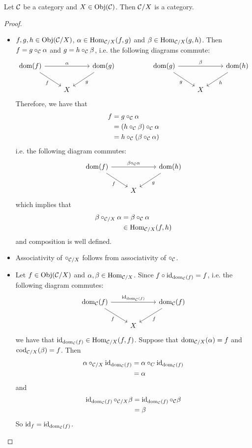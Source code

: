 \documentclass{book}
\begin{document}
	\begin{ex}  
		Let $\mathcal{C}$ be a category and $X \in \operatorname{Obj}(\mathcal{C})$. Then $\mathcal{C} / X$ is a category.
	\end{ex}

	\begin{proof}\
		\begin{itemize}
			\item $f,g, h \in \operatorname{Obj}(\mathcal{C} / X)$, $\alpha \in \operatorname{Hom}_{\mathcal{C} / X}(f, g)$ and $\beta \in \operatorname{Hom}_{\mathcal{C} / X}(g, h)$. Then $f = g \circ_{\mathcal{C}} \alpha$ and $g = h \circ_{\mathcal{C}} \beta$, i.e. the following diagrams commute:
			\[ \begin{tikzcd}
				\dom(f) \arrow[rr, "\al"] \arrow[dr, "f"'] 	
				&& \dom(g)  \arrow[dl, "g"]  
				&& \dom(g) \arrow[rr, "\be"] \arrow[dr, "g"'] 	
				&& \dom(h)  \arrow[dl, "h"]\\
				& X 
				&& &&X
			\end{tikzcd}
			\]
			Therefore, we have that 
			\begin{align*}
				f 
				& = g \circ_{\mathcal{C}} \alpha \\
				& = (h \circ_{\mathcal{C}} \beta) \circ_{\mathcal{C}} \alpha \\
				&= h \circ_{\mathcal{C}} (\beta \circ_{\mathcal{C}} \alpha) 
			\end{align*}
			i.e. the following diagram commutes:
			\[ 
			\begin{tikzcd}
				\dom(f) \arrow[rr, "\be \circ_{\MC} \al"] \arrow[dr, "f"'] 	
				& & \dom(h)  \arrow[dl, "g"] \\
				& X 
			\end{tikzcd}
			\]
			which implies that 
			\begin{align*}
				\beta \circ_{\mathcal{C} / X} \alpha 
				& = \beta \circ_{\mathcal{C}} \alpha \\
				& \in \operatorname{Hom}_{\mathcal{C} / X}(f, h)
			\end{align*}
			and composition is well defined. 
			\item Associativity of $\circ_{\mathcal{C} / X}$ follows from associativity of $\circ_{\mathcal{C}}$.
			\item Let $f \in \operatorname{Obj}(\mathcal{C} / X)$ and $\alpha, \beta \in \operatorname{Hom}_{\mathcal{C} / X}$. Since $f \circ \operatorname{id}_{\operatorname{dom}_{\mathcal{C}}(f)} = f$, i.e. the following diagram commutes: 
			\[ \begin{tikzcd}
				\dom_{\MC}(f) \arrow[rr, "\id_{\dom_{\MC}(f)}"] \arrow[dr, "f"'] 	
				& & \dom_{\MC}(f)  \arrow[dl, "f"] \\
				& X 
			\end{tikzcd}
			\]
			we have that $\operatorname{id}_{\operatorname{dom}_{\mathcal{C}}(f)} \in \operatorname{Hom}_{\mathcal{C} / X}(f, f)$.
			Suppose that $\operatorname{dom}_{\mathcal{C} / X}(\alpha) = f$ and $\operatorname{cod}_{\mathcal{C} /X}(\beta) = f$. Then 
			\begin{align*}
				\alpha \circ_{\mathcal{C} /X} \operatorname{id}_{\operatorname{dom}_{\mathcal{C}}(f)}
				&= \alpha \circ_{C} \operatorname{id}_{\operatorname{dom}_{\mathcal{C}}(f)} \\
				&= \alpha
			\end{align*}
			and 
			\begin{align*}
				\operatorname{id}_{\operatorname{dom}_{\mathcal{C}}(f)} \circ_{\mathcal{C} /X} \beta
				&= \operatorname{id}_{\operatorname{dom}_{\mathcal{C}}(f)} \circ_{\mathcal{C}} \beta \\
				&= \beta
			\end{align*}
			So $\operatorname{id}_f = \operatorname{id}_{\operatorname{dom}_{\mathcal{C}}(f)}$.
		\end{itemize}
	\end{proof}
\end{document}

